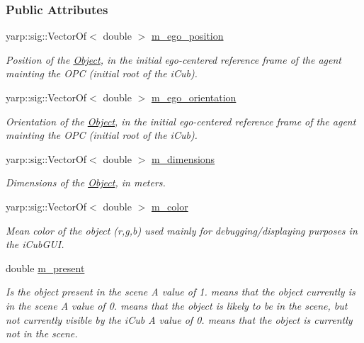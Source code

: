 \subsubsection*{Public Attributes}
\begin{DoxyCompactItemize}
\item 
yarp\+::sig\+::\+Vector\+Of$<$ double $>$ \hyperlink{group__icubclient__representations_a060b41eb669e6fc344fda352c3f63feb}{m\+\_\+ego\+\_\+position}
\begin{DoxyCompactList}\small\item\em Position of the \hyperlink{group__icubclient__representations_classicubclient_1_1Object}{Object}, in the initial ego-\/centered reference frame of the agent mainting the O\+PC (initial root of the i\+Cub). \end{DoxyCompactList}\item 
yarp\+::sig\+::\+Vector\+Of$<$ double $>$ \hyperlink{group__icubclient__representations_a9a76ee654f30131f0ccb31b08fc088d3}{m\+\_\+ego\+\_\+orientation}
\begin{DoxyCompactList}\small\item\em Orientation of the \hyperlink{group__icubclient__representations_classicubclient_1_1Object}{Object}, in the initial ego-\/centered reference frame of the agent mainting the O\+PC (initial root of the i\+Cub). \end{DoxyCompactList}\item 
yarp\+::sig\+::\+Vector\+Of$<$ double $>$ \hyperlink{group__icubclient__representations_ad3a16bbccf720dbf2d6c47af362af860}{m\+\_\+dimensions}
\begin{DoxyCompactList}\small\item\em Dimensions of the \hyperlink{group__icubclient__representations_classicubclient_1_1Object}{Object}, in meters. \end{DoxyCompactList}\item 
yarp\+::sig\+::\+Vector\+Of$<$ double $>$ \hyperlink{group__icubclient__representations_ace0d43079d691484cfe2f0a96ffebd14}{m\+\_\+color}
\begin{DoxyCompactList}\small\item\em Mean color of the object (r,g,b) used mainly for debugging/displaying purposes in the i\+Cub\+G\+UI. \end{DoxyCompactList}\item 
double \hyperlink{group__icubclient__representations_a2a4dbbc7b70e2cc2d81b4f519493ffe6}{m\+\_\+present}
\begin{DoxyCompactList}\small\item\em Is the object present in the scene A value of 1. means that the object currently is in the scene A value of 0. means that the object is likely to be in the scene, but not currently visible by the i\+Cub A value of 0. means that the object is currently not in the scene. \end{DoxyCompactList}\item 

\end{DoxyCompactItemize}
